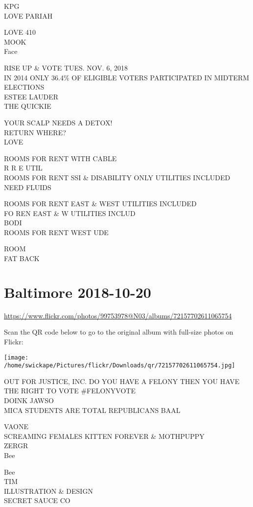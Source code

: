 \documentclass[10pt,letterpaper]{article}
\begin{document}
KPG\\
LOVE PARIAH

LOVE 410\\
MOOK\\
Face

RISE UP \& VOTE TUES. NOV. 6, 2018\\
IN 2014 ONLY 36.4\% OF ELIGIBLE VOTERS PARTICIPATED IN MIDTERM ELECTIONS\\
ESTEE LAUDER\\
THE QUICKIE

YOUR SCALP NEEDS A DETOX!\\
RETURN WHERE?\\
LOVE

ROOMS FOR RENT WITH CABLE\\
R R E UTIL\\
ROOMS FOR RENT SSI \& DISABILITY ONLY UTILITIES INCLUDED\\
NEED FLUIDS

ROOMS FOR RENT EAST \& WEST UTILITIES INCLUDED\\
FO REN EAST \& W UTILITIES INCLUD\\
BODI\\
ROOMS FOR RENT WEST UDE

ROOM\\
FAT BACK
\pagebreak

\section*{Baltimore 2018-10-20}

\url{https://www.flickr.com/photos/99753978@N03/albums/72157702611065754}

Scan the QR code below to go to the original album with full-size photos on Flickr:

\texttt{[image: /home/swickape/Pictures/flickr/Downloads/qr/72157702611065754.jpg]}
\pagebreak

OUT FOR JUSTICE, INC. DO YOU HAVE A FELONY THEN YOU HAVE THE RIGHT TO VOTE \#FELONYVOTE\\
DOINK JAWSO\\
MICA STUDENTS ARE TOTAL REPUBLICANS BAAL

VAONE\\
SCREAMING FEMALES KITTEN FOREVER \& MOTHPUPPY\\
ZERGR\\
Bee

Bee\\
TIM\\
ILLUSTRATION \& DESIGN\\
SECRET SAUCE CO
\end{document}
